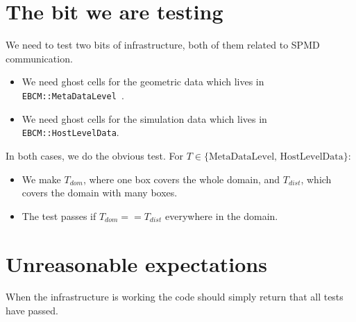\documentclass{article}
\begin{document}
\section{The bit we are testing}

We need to test two bits of infrastructure, both of them related to
SPMD communication.  
\begin{itemize}
  \item We need ghost cells for the geometric data which lives in {\tt
    EBCM::MetaDataLevel }.
  \item We need ghost cells for the simulation data which lives in {\tt
    EBCM::HostLevelData}.
\end{itemize}
In both cases, we do the obvious test.
For $T \in \{\mbox{MetaDataLevel, HostLevelData} \}$:
\begin{itemize}
  \item We make $T_{dom}$, where one box covers the whole domain, and
    $T_{dist}$, which covers the domain with many boxes.
  \item The test passes if $T_{dom} == T_{dist}$ everywhere in the domain.
\end{itemize}

\section{Unreasonable expectations}

When the infrastructure is working the code should simply return that
all tests have passed.


\renewcommand{\thefootnote}{\fnsymbol{footnote}}\

\end{document}
